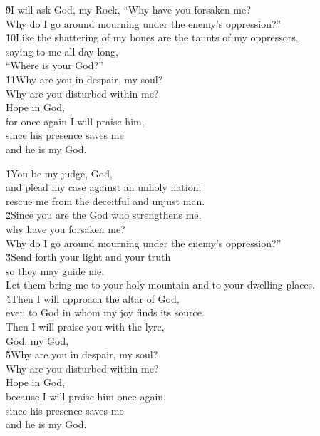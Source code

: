 \begin{poetry}
\poeml \v{9}I will ask God, my Rock, ``Why have you forsaken me? \\
\poemll    Why do I go around mourning under the enemy's oppression?'' \\
\poeml \v{10}Like the shattering of my bones are the taunts of my oppressors, \\
\poemll    saying to me all day long, \\
\poemlll       ``Where is your God?'' \\
\poeml \v{11}Why are you in despair, my soul? \\
\poemll    Why are you disturbed within me? \\
\poeml Hope in God, \\
\poemll    for once again I will praise him, \\
\poeml since his presence saves me \\
\poemll    and he is my God.
\end{poetry}

\begin{poetry}
\poeml \v{1}You be my judge, God, \\
\poemll    and plead my case against an unholy nation; \\
\poemlll       rescue me from the deceitful and unjust man. \\
\poeml \v{2}Since you are the God who strengthens me, \\
\poemll    why have you forsaken me? \\
\poeml Why do I go around mourning under the enemy's oppression?'' \\
\poeml \v{3}Send forth your light and your truth \\
\poemll    so they may guide me. \\
\poeml Let them bring me to your holy mountain and to your dwelling places. \\
\poeml \v{4}Then I will approach the altar of God, \\
\poemll    even to God in whom my joy finds its source. \\
\poeml Then I will praise you with the lyre, \\
\poemll    God, my God, \\
\poeml \v{5}Why are you in despair, my soul? \\
\poemll    Why are you disturbed within me? \\
\poeml Hope in God, \\
\poemll    because I will praise him once again, \\
\poeml since his presence saves me \\
\poemll    and he is my God.
\end{poetry}

